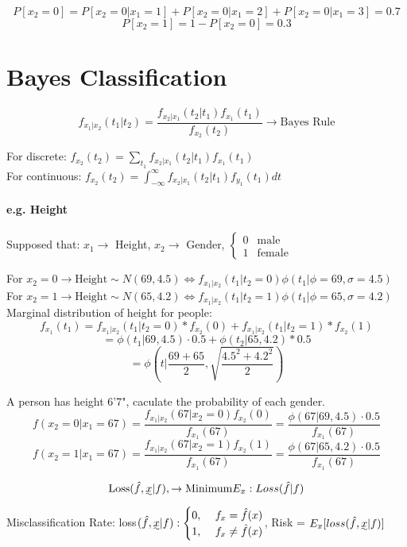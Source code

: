 \documentclass{article}
\begin{document}
{{{            \[P[x_2= 0] = P[x_2=0 \vert x_1=1]+P[x_2=0 \vert x_1=2]+P[x_2=0 \vert x_1=3]=0.7\]
            \[P[x_2= 1] = 1 - P[x_2= 0] = 0.3\]
        }
    }
}

\section{Bayes Classification}{
    \[f_{x_1|x_2}(t_1|t_2)=\frac{f_{x_2|x_1}(t_2|t_1)f_{x_1}(t_1)}{f_{x_2}(t_2)} \rightarrow \text{Bayes Rule}\]

    For discrete: \(f_{x_2}(t_2)= \sum_{t_1}f_{x_2|x_1}(t_2|t_1)f_{x_1}(t_1)\)\\

    For continuous: \(f_{x_2}(t_2)= \int_{-\infty}^{\infty}f_{x_2|x_1}(t_2|t_1)f_{y_1}(t_1)dt\)

    \paragraph{e.g. Height}{
        Supposed that: $x_1 \rightarrow$ Height, $x_2 \rightarrow$ Gender,
        \(\begin{cases} 0  & \text{male} \\ 
        1& \text{female} \end{cases}\)

        For \(x_2= 0 \rightarrow \text{Height} \sim N(69,4.5) \Leftrightarrow f_{x_1|x_2}(t_1|t_2= 0)\phi( t_1|\phi=69, \sigma= 4.5)\)\\

        For \(x_2= 1 \rightarrow \text{Height} \sim N(65,4.2)\Leftrightarrow f_{x_1|x_2}(t_1|t_2= 1)\phi( t_1|\phi=65, \sigma= 4.2)\)\\
            
        Marginal distribution of height for people:
        \[f_{x_1}(t_1)=f_{x_1|x_2}(t_1|t_2= 0)*f_{x_2}(0)+f_{x_1|x_2}(t_1|t_2= 1)*f_{x_2}(1)\]
        \[= \phi(t_1|69, 4.5)\cdot 0.5+\phi(t_2|65, 4.2)*0.5\]
        \[= \phi(t|\frac{69+65}{2},\sqrt{\frac{4.5^2+4.2^2}{2}} )\]

        A person has height 6'7", caculate the probability of each gender.
        \[f(x_2= 0| x_1=67)=\frac{ f_{x_1|x_2}(67|x_2= 0)f_{x_2}(0)}{f_{x_1}(67)}=\frac{\phi(67|69,4.5)\cdot 0.5}{f_{x_1}(67)}\]
        \[f(x_2= 1| x_1=67)=\frac{ f_{x_1|x_2}(67|x_2= 1)f_{x_2}(1)}{f_{x_1}(67)}=\frac{\phi(67|65,4.2)\cdot 0.5}{f_{x_1}(67)}\]
    } 

    \[\text{Loss}(\hat{f}, \uwave{x}|f), \rightarrow \text{Minimum} E_x: Loss (\hat{f}|f)\]
    Misclassification Rate: loss\((\hat{f}, \uwave{x}|f): \begin{cases} 
        0, &\  f_x=\hat{f}(x) \\ 
        1, &\  f_x \ne \hat{f}(x) 
    \end{cases}\), Risk = \(E_x[loss(\hat{f}, \uwave{x}|f)]\)\\

}
\end{document}
